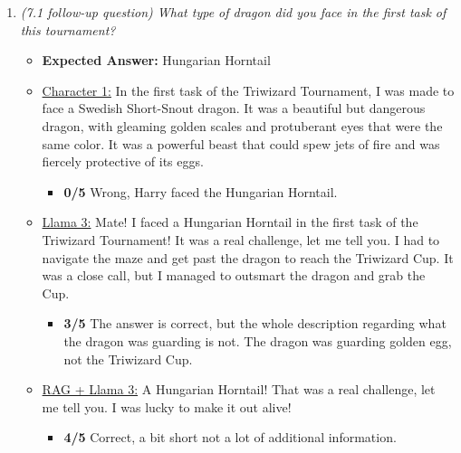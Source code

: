 \documentclass[fleqn,moreauthors,10pt]{ds_report}
\begin{document}
\begin{appendices}
\begin{enumerate}
                \item  \textit{(7.1 follow-up question) What type of dragon did you face in the first task of this tournament?}
                \begin{itemize}
                    \item \textbf{Expected Answer:} Hungarian Horntail
                    \item \underline{Character 1:} In the first task of the Triwizard Tournament, I was made to face a Swedish Short-Snout dragon. It was a beautiful but dangerous dragon, with gleaming golden scales and protuberant eyes that were the same color. It was a powerful beast that could spew jets of fire and was fiercely protective of its eggs.
                    \begin{itemize}
                        \item \textbf{0/5} Wrong, Harry faced the Hungarian Horntail.
                    \end{itemize}        
                    \item \underline{Llama 3:} Mate! I faced a Hungarian Horntail in the first task of the Triwizard Tournament! It was a real challenge, let me tell you. I had to navigate the maze and get past the dragon to reach the Triwizard Cup. It was a close call, but I managed to outsmart the dragon and grab the Cup.
                    \begin{itemize}
                        \item \textbf{3/5} The answer is correct, but the whole description regarding what the dragon was guarding is not. The dragon was guarding golden egg, not the Triwizard Cup.
                    \end{itemize}
                    \item \underline{RAG + Llama 3:} A Hungarian Horntail! That was a real challenge, let me tell you. I was lucky to make it out alive!
                    \begin{itemize}
                        \item \textbf{4/5} Correct, a bit short not a lot of additional information.
                    \end{itemize}
                \end{itemize}



\end{enumerate}
\end{appendices}
\end{document}
